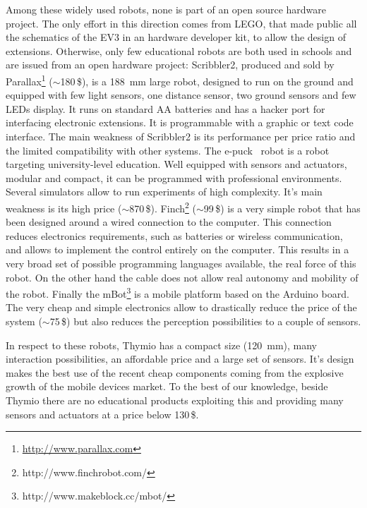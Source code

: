\documentclass[letterpaper, 10 pt, conference]{ieeeconf}  %
\begin{document}
Among these widely used robots, none is part of an open source hardware project.
The only effort in this direction comes from LEGO, that made public all the schematics of the EV3 in an hardware developer kit, to allow the design of extensions. 
Otherwise, only few educational robots are both used in schools and are issued from an open hardware project:
Scribbler2, produced and sold by Parallax\footnote{\url{http://www.parallax.com}} ($\sim$180\,\$), is a 188~mm large robot, designed to run on the ground and equipped with few light sensors, one distance sensor, two ground sensors and few LEDs display.
It runs on standard AA batteries and has a hacker port for interfacing electronic extensions.
It is programmable with a graphic or text code interface.  
The main weakness of Scribbler2 is its performance per price ratio and the limited compatibility with other systems. 
The e-puck~\cite{mondada2009puck} robot is a robot targeting university-level education.
Well equipped with sensors and actuators, modular and compact, it can be programmed with professional environments.
Several simulators allow to run experiments of high complexity. 
It's main weakness is its high price ($\sim$870\,\$).
Finch\footnote{http://www.finchrobot.com/} ($\sim$99\,\$) is a very simple robot that has been designed around a wired connection to the computer. 
This connection reduces electronics requirements, such as batteries or wireless communication, and allows to implement the control entirely on the computer.
This results in a very broad set of possible programming languages available, the real force of this robot. 
On the other hand the cable does not allow real autonomy and mobility of the robot.
Finally the mBot\footnote{http://www.makeblock.cc/mbot/} is a mobile platform based on the Arduino board. 
The very cheap and simple electronics allow to drastically reduce the price of the system ($\sim$75\,\$) but also reduces the perception possibilities to a couple of sensors. 

In respect to these robots, Thymio has a compact size (120~mm), many interaction possibilities, an affordable price and a large set of sensors.
It's design makes the best use of the recent cheap components coming from the explosive growth of the mobile devices market. 
To the best of our knowledge, beside Thymio there are no educational products exploiting this and providing many sensors and actuators at a price below 130\,\$.
\end{document}

